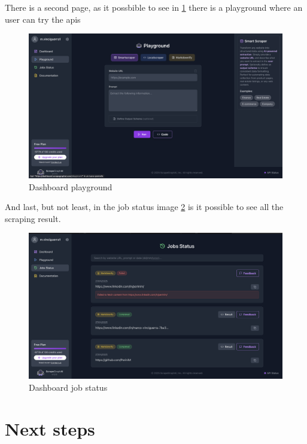 There is a second page, as it possbible to see in \ref{fig:enter-dashboard-playground} there is a playground where an user can try the apis
\begin{figure}[H]
    \centering
    \includegraphics[width=0.95\linewidth]{Assets/dashboard_2.png}
    \caption{Dashboard playground}
    \label{fig:enter-dashboard-playground}
\end{figure}

And last, but not least, in the job status image \ref{fig:enter-dashboard-status} is it possible to see all the scraping result.
\begin{figure}[H]
    \centering
    \includegraphics[width=0.95\linewidth]{Assets/dashboard_3.png}
    \caption{Dashboard job status}
    \label{fig:enter-dashboard-status}
\end{figure}

\section{Next steps}
